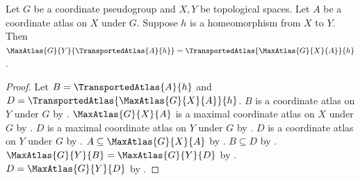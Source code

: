 \begin{theorem}\label{transported_atlas_maximalization}
    Let $G$ be a coordinate pseudogroup and $X,Y$ be topological spaces.
    Let $A$ be a coordinate atlas on $X$ under $G$.
    Suppose $h$ is a homeomorphism from $X$ to $Y$.
    Then $\MaxAtlas{G}{Y}{\TransportedAtlas{A}{h}}
        =\TransportedAtlas{\MaxAtlas{G}{X}{A}}{h}$.
\end{theorem}
\begin{proof}
    Let $B=\TransportedAtlas{A}{h}$ and $D=\TransportedAtlas{\MaxAtlas{G}{X}{A}}{h}$.
    $B$ is a coordinate atlas on $Y$ under $G$ by .
    $\MaxAtlas{G}{X}{A}$ is a maximal coordinate atlas on $X$ under $G$ by
        .
    $D$ is a maximal coordinate atlas on $Y$ under $G$ by
        .
    $D$ is a coordinate atlas on $Y$ under $G$ by .
    $A\subseteq\MaxAtlas{G}{X}{A}$ by .
    $B\subseteq D$ by .
    $\MaxAtlas{G}{Y}{B}=\MaxAtlas{G}{Y}{D}$ by .
    $D=\MaxAtlas{G}{Y}{D}$ by .
\end{proof}
